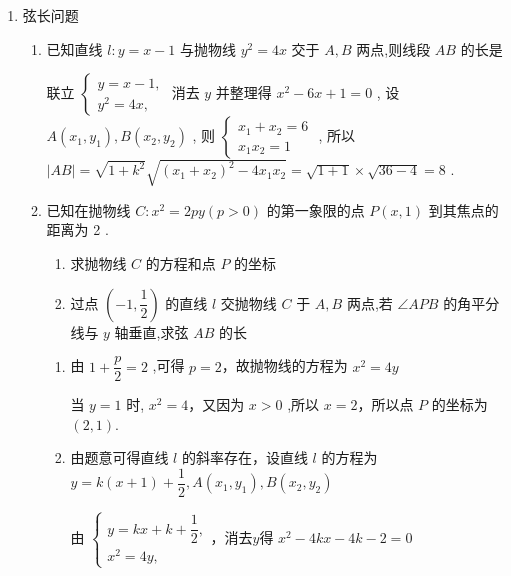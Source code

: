 \begin{enumerate}
    \item 弦长问题
    \begin{enumerate}
        \item 已知直线 $l : y = x - 1$ 与抛物线 ${y}^{2} = {4x}$ 交于 $A,B$ 两点,则线段 ${AB}$ 的长是
        \begin{jieda}
            联立 $\left\{  \begin{array}{l} y = x - 1, \\  {y}^{2} = {4x}, \end{array}\right.$ 消去 $y$ 并整理得 ${x}^{2} - {6x} + 1 = 0$ , 设 $A\left( {{x}_{1},{y}_{1}}\right) ,B\left( {{x}_{2},{y}_{2}}\right)$ , 则 $\left\{\begin{array}{l}
                 {x}_{1} + {x}_{2} = 6  \\
                 {x}_{1}{x}_{2} = 1
            \end{array}\right.$ , 所以 $\left| {AB}\right|  = \sqrt{1 + {k}^{2}}\sqrt{{\left( {x}_{1} + {x}_{2}\right) }^{2} - 4{x}_{1}{x}_{2}} = \sqrt{1 + 1} \times  \sqrt{{36} - 4} = 8$ .
        \end{jieda}
        \item 已知在抛物线 $C : {x}^{2} = {2py}\left( {p > 0}\right)$ 的第一象限的点 $P\left( {x,1}\right)$ 到其焦点的距离为 2 .
        \begin{enumerate}
            \item 求抛物线 $C$ 的方程和点 $P$ 的坐标
            \item 过点 $\left( {-1,\dfrac{1}{2}}\right)$ 的直线 $l$ 交抛物线 $C$ 于 $A,B$ 两点,若 $\angle {APB}$ 的角平分线与 $y$ 轴垂直,求弦 ${AB}$ 的长
        \end{enumerate}
        \begin{jieda}
            \begin{enumerate}
                \item 由 $1 + \dfrac{p}{2} = 2$ ,可得 $p = 2$，故抛物线的方程为 ${x}^{2} = {4y}$

                当 $y = 1$ 时, ${x}^{2} = 4$，又因为 $x > 0$ ,所以 $x = 2$，所以点 $P$ 的坐标为$(2,1)$.

                \item 由题意可得直线 $l$ 的斜率存在，设直线 $l$ 的方程为 $y = k\left( {x + 1}\right)  + \dfrac{1}{2},A\left( {{x}_{1},{y}_{1}}\right) ,B\left( {{x}_{2},{y}_{2}}\right)$ 
                
                由 $\left\{  \begin{array}{l} y = {kx} + k + \dfrac{1}{2}, \\  {x}^{2} = {4y}, \end{array}\right.$，消去$y$得 ${x}^{2} - {4kx} - {4k} - 2 = 0$
                

\end{enumerate}
\end{jieda}
\end{enumerate}
\end{enumerate}
